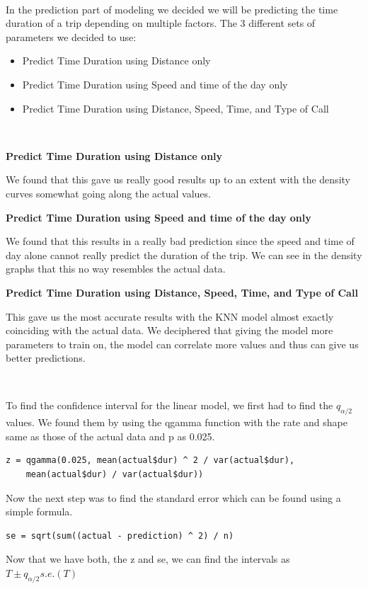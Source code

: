 \documentclass[11pt]{article}
\begin{document}
\\
\par
In the prediction part of modeling we decided we will be predicting the time duration of a trip depending on multiple factors. The 3 different sets of parameters we decided to use:
\begin{itemize}
	\item Predict Time Duration using Distance only
	\item Predict Time Duration using Speed and time of the day only
	\item Predict Time Duration using Distance, Speed, Time, and Type of Call
\end{itemize}

\\
\par
\textbf{Predict Time Duration using Distance only}
\par
We found that this gave us really good results up to an extent with the density curves somewhat going along the actual values.

\textbf{Predict Time Duration using Speed and time of the day only}
\par
We found that this results in a really bad prediction since the speed and time of day alone cannot really predict the duration of the trip. We can see in the density graphs that this no way resembles the actual data.

\textbf{Predict Time Duration using Distance, Speed, Time, and Type of Call}
\par
This gave us the most accurate results with the KNN model almost exactly coinciding with the actual data. We deciphered that giving the model more parameters to train on, the model can correlate more values and thus can give us better predictions.

\\
\par
To find the confidence interval for the linear model, we first had to find the $q_{\alpha/2}$ values. We found them by using the qgamma function with the rate and shape same as those of the actual data and p as 0.025.
\begin{lstlisting}
z = qgamma(0.025, mean(actual$dur) ^ 2 / var(actual$dur), 
    mean(actual$dur) / var(actual$dur))
\end{lstlisting}
\par
Now the next step was to find the standard error which can be found using a simple formula.
\begin{lstlisting}
se = sqrt(sum((actual - prediction) ^ 2) / n)
\end{lstlisting}
Now that we have both, the z and se, we can find the intervals as $T \pm q_{\alpha/2} s.e.(T)$
\end{document}

